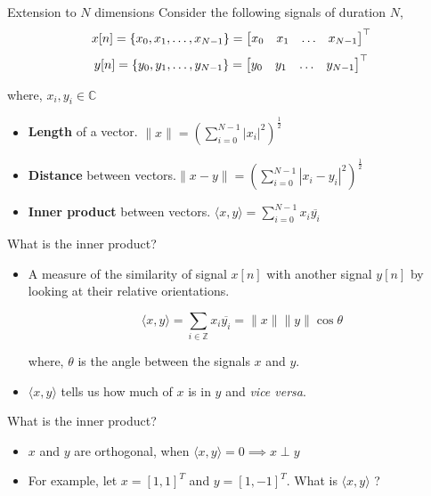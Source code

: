 \documentclass[aspectratio=169]{beamer}
\let\olditem\item
\renewcommand{\item}{\setlength{\itemsep}{\fill}\olditem}
\def\bmx{\ensuremath\begin{bmatrix*}[r]}
\def\emx{\ensuremath\end{bmatrix*}}
\begin{document}
\begin{frame}{Extension to $N$ dimensions}
Consider the following signals of duration $N$,
\[ x[n] = \{x_0, x_1, \ldots, x_{N-1}\} = \bmx x_0 & x_1 & \ldots & x_{N-1}\emx^\top \]
\[ y[n] = \{y_0, y_1, \ldots, y_{N-1}\} = \bmx y_0 & y_1 & \ldots & y_{N-1}\emx^\top \]

where, $x_i, y_i \in \mathbb{C}$

\begin{itemize}
\item \textbf{Length} of a vector. $\|x\| = \left(\sum_{i=0}^{N-1} \left|x_i\right| ^2\right)^{\frac{1}{2}}$
\item \textbf{Distance} between vectors.$\|x - y\| = \left(\sum_{i=0}^{N-1} \left|x_i - y_i\right| ^2\right)^{\frac{1}{2}}$
\item \textbf{Inner product} between vectors. $\langle x, y \rangle = \sum_{i=0}^{N-1}x_i\overline{y_i}$
\end{itemize}
\end{frame}

\begin{frame}[t]{What is the inner product?}
\begin{itemize}
\item A measure of the similarity of signal $x[n]$ with another signal $y[n]$ by looking at their relative orientations.

\[ \langle x,y \rangle = \sum_{i \in \mathbb{Z}} x_i\overline{y_i} = \|x\|\|y\|\cos \theta\]

where, $\theta$ is the angle between the signals $x$ and $y$.

\item $\langle x,y \rangle$ tells us how much of $x$ is in $y$ and \textit{vice versa}.

\end{itemize}
\end{frame}


\begin{frame}[t]{What is the inner product?}
\begin{itemize}
\item $x$ and $y$ are orthogonal, when $\langle x,y \rangle = 0 \implies x \perp y$

\item For example, let $x = \left[1, 1\right]^{T}$ and $y = \left[1, -1\right]^{T}$. What is  $\langle x,y  \rangle$ ?
\end{itemize}
\end{frame}
\end{document}
